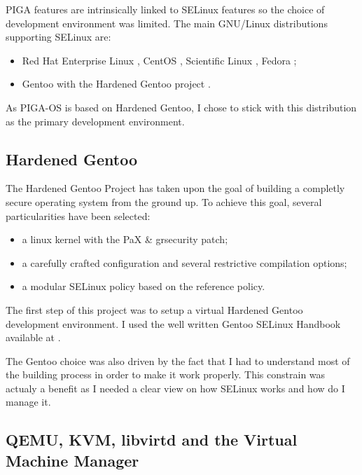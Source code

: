 \documentclass[pdftex,a4paper,titlepage,11pt]{article}
\begin{document}
PIGA features are intrinsically linked to SELinux features so the choice of
development environment was limited. The main GNU/Linux distributions
supporting SELinux are:

\begin{itemize}
	\item Red Hat Enterprise Linux \cite{rhelwebsite}, CentOS
\cite{centoswebsite}, Scientific
Linux \cite{scientificlinuxwebsite}, Fedora \cite{fedorawebsite};
	\item Gentoo \cite{gentoowebsite} with the Hardened Gentoo project
\cite{gentoohardenedproject}.
\end{itemize}

\smallskip

As PIGA-OS is based on Hardened Gentoo, I chose to stick with this distribution
as the primary development environment.

\subsection{Hardened Gentoo}

The Hardened Gentoo Project has taken upon the goal of building a completly
secure operating system from the ground up. To achieve this goal, several
particularities have been selected:
\begin{itemize}
	\item a linux kernel with the PaX \& grsecurity patch;
	\item a carefully crafted configuration and several restrictive
compilation options;
	\item a modular SELinux policy based on the reference policy.
\end{itemize}

\smallskip

The first step of this project was to setup a virtual Hardened Gentoo
development environment. I used the well written Gentoo SELinux Handbook
available at \cite{gentooselinuxhandbook}.

\bigskip

The Gentoo choice was also driven by the fact that I had to understand most of
the building process in order to make it work properly. This constrain was
actualy a benefit as I needed a clear view on how SELinux works and how do I
manage it.

\subsection{QEMU, KVM, libvirtd and the Virtual Machine Manager}
\end{document}
